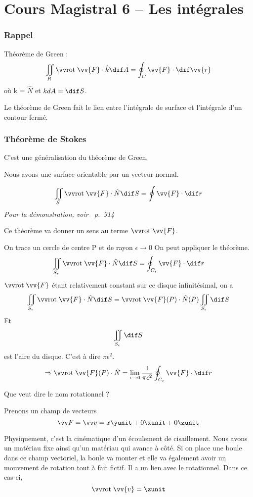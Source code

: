 \part{Cours Magistral 6 -- Les intégrales}
\section{Rappel}

Théorème de Green :
\[ \iint_R \rot \vv{F} \cdot \hat{k} \dif A = \oint_C \vv{F} \cdot \dif \vv{r} \]
où k = $\hat{N}$ et $kdA = \dif S$.

Le théorème de Green fait le lien entre l'intégrale de surface et l'intégrale d'un contour fermé.


\section{Théorème de Stokes}

C'est une généralisation du théorème de Green.

Nous avons une surface orientable par un vecteur normal.

\[\iint_S \rot \vv{F}\cdot \hat{N} \dif S = \oint \vv{F}\cdot \dif r\]
\textit{Pour la démonstration, voir~\cite{adams2013calculus} p.~914}

Ce théorème va donner un sens au terme $\rot \vv{F}$.

On trace un cercle de centre P et de rayon $\epsilon \to 0$ On peut appliquer le théorème.
\[\iint_{S_{\epsilon}} \rot \vv{F} \cdot \hat{N} \dif S = \oint_{C_{\epsilon}} \vv{F} \cdot \dif r\]
$\rot \vv{F}$ étant relativement constant sur ce disque infinitésimal, on a
\[\iint_{S_{\epsilon}} \rot \vv{F}\cdot \hat{N} \dif S = \rot \vv{F} (P) \cdot \hat{N} (P) \iint_{S_{\epsilon}} \dif S\]
Et \[\iint_{S_{\epsilon}} \dif S\] est l'aire du disque. C'est à dire $\pi \epsilon ^2$.
\[\Rightarrow \rot \vv{F}(P) \cdot \hat{N} = \lim_{\epsilon \to 0 }\frac{1}{\pi \epsilon ^2} \oint_{C_{\epsilon}} \vv{F} \cdot \dif r\]

Que veut dire le nom \og rotationnel\fg{} ?

Prenons un champ de vecteurs
\[\vv F = \vv v = x \yunit +0 \xunit +0 \zunit\]

Physiquement, c'est la cinématique d'un écoulement de cisaillement. Nous avons un matériau fixe ainsi qu'un matériau qui avance à côté.
Si on place une \og boule\fg{} dans ce champ vectoriel, la boule va monter et elle va également avoir un mouvement de rotation tout à fait fictif. Il a un lien avec le rotationnel. Dans ce cas-ci,\[\rot \vv{v} = \zunit\]

